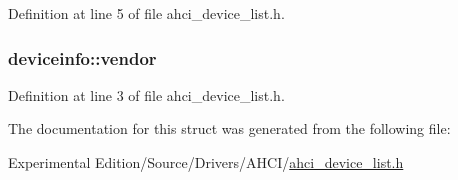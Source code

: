 Definition at line 5 of file ahci\+\_\+device\+\_\+list.\+h.

\subsubsection[{\texorpdfstring{vendor}{vendor}}]{ deviceinfo\+::vendor}\hypertarget{structdeviceinfo_a5c3543ae796c7c71e2c2bc4115993032}{}\label{structdeviceinfo_a5c3543ae796c7c71e2c2bc4115993032}


Definition at line 3 of file ahci\+\_\+device\+\_\+list.\+h.



The documentation for this struct was generated from the following file\+:\begin{DoxyCompactItemize}
\item 
Experimental Edition/\+Source/\+Drivers/\+A\+H\+C\+I/\hyperlink{ahci__device__list_8h}{ahci\+\_\+device\+\_\+list.\+h}\end{DoxyCompactItemize}
